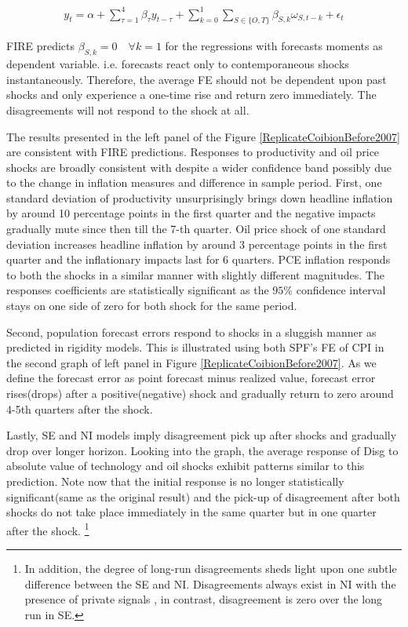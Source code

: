 \documentclass[]{article}
\begin{document}
	\begin{eqnarray}\label{IRRegression}
		y_{t}  = \alpha + \sum^4_{\tau=1} \beta_{\tau} y_{t-\tau} +  \sum^1_{k=0} \sum_{S \in \{O,T\}}\beta_{S,k}\omega_{S,t-k} + \epsilon_t 
	\end{eqnarray}
	
	FIRE predicts $\beta_{S,k}=0\quad \forall k=1$ for the regressions with forecasts moments as dependent variable. i.e. forecasts react only to contemporaneous shocks instantaneously. Therefore, the average FE should not be dependent upon past shocks and  only experience a one-time rise and return zero immediately. The disagreements will not respond to the shock at all. 
	
	The results  presented in the left panel of the Figure \ref{ReplicateCoibionBefore2007} are consistent with FIRE predictions. Responses to productivity and oil price shocks are broadly consistent with \citet{coibion2012can} despite a wider confidence band possibly due to the change in inflation measures and difference in sample period. First, one standard deviation of productivity unsurprisingly brings down headline inflation by around 10 percentage points  in the first quarter and the negative impacts gradually mute since then till the 7-th quarter. Oil price shock of one standard deviation increases headline inflation by around 3 percentage points in the first quarter and the inflationary impacts last for 6 quarters. PCE inflation responds to both the shocks in a similar manner with slightly different magnitudes. The responses coefficients are statistically significant as the $95\%$ confidence interval stays on one side of zero for both shock for the same period. 
	
	Second, population forecast errors respond to shocks in a sluggish manner as predicted in rigidity models. This is illustrated using both SPF's FE of CPI in the second graph of  left panel in Figure \ref{ReplicateCoibionBefore2007}. As we define the forecast error as point forecast minus realized value, forecast error rises(drops) after a positive(negative) shock and gradually return to zero around 4-5th quarters after the shock. 
	
	Lastly, SE and NI models imply disagreement pick up after shocks and gradually drop over longer horizon.  Looking into the graph, the average response of Disg to absolute value of  technology and oil shocks exhibit patterns similar to this prediction. Note now that the initial response is no longer statistically significant(same as the original result) and the pick-up of disagreement after both shocks do not take place immediately in the same quarter but in one quarter after the shock. \footnote{In addition, the degree of long-run disagreements sheds light upon one subtle difference between the SE and NI. Disagreements always exist in NI with the presence of private signals , in contrast, disagreement is zero over the long run in SE. }
	
\end{document}
